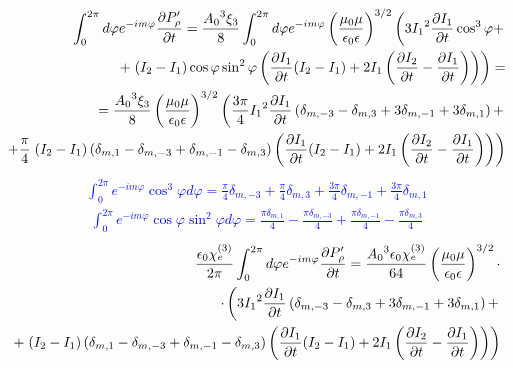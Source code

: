 \textcolor{blue} { \begin{equation*} \begin{aligned}
\int_{0}^{2 \pi} d \varphi e^{-im \varphi} \frac{\partial P_\rho^\prime}{\partial t} = 
\frac{ {A_0}^3 \xi_3 }{ 8 } \int_{0}^{2\pi} d \varphi
e^{-im\varphi} \left( \frac{\mu_0 \mu} {\epsilon_0 \epsilon} \right)^{3/2} 
\left( 3 {I_1}^2 \frac{\partial I_1}{\partial t} \cos^3 \varphi + \right. \\
+ \left. ( I_2 - I_1 ) \cos \varphi \sin^2 \varphi \left( 
\frac{\partial I_1}{\partial t} ( I_2 - I_1 ) + 2 I_1 \left( \frac{\partial I_2}{\partial t} - 
\frac{\partial I_1}{\partial t} \right) \right) \right) = \\
= \frac{ {A_0}^3 \xi_3 }{ 8 } 
\left( \frac{\mu_0 \mu} {\epsilon_0 \epsilon} \right)^{3/2}
\left( \frac{3 \pi}{4} {I_1}^2 \frac{\partial I_1}{\partial t} \left( \delta_{m,-3} - 
\delta_{m,3} + 3 \delta_{m,-1} + 3 \delta_{m,1} \right) + \right. \\
+ \frac{\pi }{4} \left. ( I_2 - I_1 ) \left( \delta_{m,1} - 
\delta_{m,-3} + \delta_{m,-1} - \delta_{m,3} \right) \left( 
\frac{\partial I_1}{\partial t} ( I_2 - I_1 ) + 2 I_1 \left( \frac{\partial I_2}{\partial t} - 
\frac{\partial I_1}{\partial t} \right) \right) \right)
\end{aligned} \end{equation*} }
%
\textcolor{blue} { \begin{equation*} \begin{aligned}
\int_{0}^{2\pi} e^{-i m \varphi} \cos^3 \varphi d \varphi = 
\frac{\pi}{4} \delta_{m,-3} + \frac{\pi}{4} \delta_{m,3} + 
\frac{3 \pi}{4} \delta_{m,-1} + \frac{3 \pi}{4} \delta_{m,1}
\end{aligned} \end{equation*} }
%
\textcolor{blue} { \begin{equation*} \begin{aligned}
\int_{0}^{2\pi} e^{-i m \varphi} \cos \varphi \sin^2 \varphi d \varphi = 
\frac{\pi \delta_{m,1} }{4} - \frac{\pi \delta_{m,-3} }{4} + 
\frac{\pi \delta_{m,-1} }{4} - \frac{\pi \delta_{m,3} }{4}
\end{aligned} \end{equation*} }
%
\begin{equation*} \begin{aligned}
\frac{\epsilon_0 \chi_e^{(3)}}{2 \pi} \int_{0}^{2\pi} d \varphi 
e^{-im \varphi} \frac{\partial P_\rho^\prime}{\partial t} = 
\frac{ {A_0}^3 \epsilon_0 \chi_e^{(3)}}{ 64 } 
\left( \frac{\mu_0 \mu} {\epsilon_0 \epsilon} \right)^{3/2} \cdot \\ 
\cdot \left( 3 {I_1}^2 \frac{\partial I_1}{\partial t} \left( \delta_{m,-3} - 
\delta_{m,3} + 3 \delta_{m,-1} + 3 \delta_{m,1} \right) + \right. \\
+ \left. ( I_2 - I_1 ) \left( \delta_{m,1} - 
\delta_{m,-3} + \delta_{m,-1} - \delta_{m,3} \right) \left( 
\frac{\partial I_1}{\partial t} ( I_2 - I_1 ) + 2 I_1 \left( \frac{\partial I_2}{\partial t} - 
\frac{\partial I_1}{\partial t} \right) \right) \right)
\end{aligned} \end{equation*}
